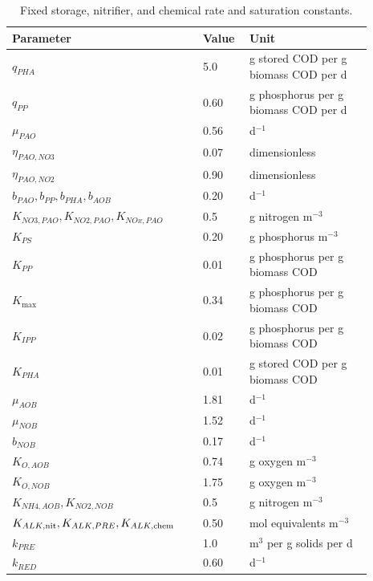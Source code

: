 \begin{table}[htbp]
\centering\small
\caption{Fixed storage, nitrifier, and chemical rate and saturation constants.}
\label{tab:plant_storage_nitrifier_constants}
\begin{tabular}{p{0.48\linewidth}p{0.10\linewidth}p{0.31\linewidth}}
\toprule Parameter & Value & Unit\\\midrule
$q_{PHA}$ & 5.0 & g stored COD per g biomass COD per d\\
$q_{PP}$ & 0.60 & g phosphorus per g biomass COD per d\\
$\mu_{PAO}$ & 0.56 & d$^{-1}$\\
$\eta_{PAO,NO3}$ & 0.07 & dimensionless\\
$\eta_{PAO,NO2}$ & 0.90 & dimensionless\\
$b_{PAO},b_{PP},b_{PHA},b_{AOB}$ & 0.20 & d$^{-1}$\\
$K_{NO3,PAO},K_{NO2,PAO},K_{NOx,PAO}$ & 0.5 & g nitrogen m$^{-3}$\\
$K_{PS}$ & 0.20 & g phosphorus m$^{-3}$\\
$K_{PP}$ & 0.01 & g phosphorus per g biomass COD\\
$K_{\max}$ & 0.34 & g phosphorus per g biomass COD\\
$K_{IPP}$ & 0.02 & g phosphorus per g biomass COD\\
$K_{PHA}$ & 0.01 & g stored COD per g biomass COD\\
$\mu_{AOB}$ & 1.81 & d$^{-1}$\\
$\mu_{NOB}$ & 1.52 & d$^{-1}$\\
$b_{NOB}$ & 0.17 & d$^{-1}$\\
$K_{O,AOB}$ & 0.74 & g oxygen m$^{-3}$\\
$K_{O,NOB}$ & 1.75 & g oxygen m$^{-3}$\\
$K_{NH4,AOB},K_{NO2,NOB}$ & 0.5 & g nitrogen m$^{-3}$\\
$K_{ALK,\rm nit},K_{ALK,PRE},K_{ALK,\rm chem}$ & 0.50 & mol equivalents m$^{-3}$\\
$k_{PRE}$ & 1.0 & m$^3$ per g solids per d\\
$k_{RED}$ & 0.60 & d$^{-1}$\\
\bottomrule
\end{tabular}
\end{table}

